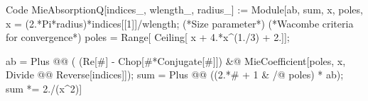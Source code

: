 {\footnotesize
\begin{mmaCell}[
	pattern = {indices_, wlength_, radius_, indices, wlength, radius, \#},
	local = {ab, sum, x, poles}
	]{Code}	
  MieAbsorptionQ[indices_, wlength_, radius_] := 
   Module[{ab, sum, x, poles},
    x = (2.*Pi*radius)*indices[[1]]/wlength; (*Size parameter*)
    (*Wacombe criteria for convergence*)
    poles = Range[ Ceiling[ x + 4.*x^(1./3) + 2.]]; 
    
    ab = Plus @@ ( (Re[#] - Chop[#*Conjugate[#]]) &@ 
    		  MieCoefficient[poles, x, Divide @@ Reverse[indices]]);
    sum = Plus @@ ((2.*# + 1 & /@ poles) * ab);
   sum *= 2./(x^2)]
\end{mmaCell}
}



















